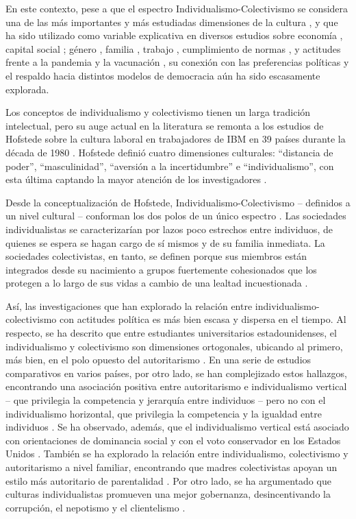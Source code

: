 \documentclass[12pt,twoside]{templates/facsothesis}
\begin{document}
En este contexto, pese a que el espectro Individualismo-Colectivismo se considera una de las más importantes y más estudiadas dimensiones de la cultura \citep{binder2019, fatehi2020}, y que ha sido utilizado como variable explicativa en diversos estudios sobre economía \citep{binder2019, kyriacou2016, germani2021, toikko2020}, capital social \citep{beilmann2018}; género \citep{dabiriyantehrani2022, davis2019}, familia \citep{al-hassan2021, rudy2006}, trabajo \citep{refslund2022, solis2018, stewart2020}, cumplimiento de normas \citep{varet2018, zhang2020}, y actitudes frente a la pandemia y la vacunación \citep{card2022}, su conexión con las preferencias políticas y el respaldo hacia distintos modelos de democracia aún ha sido escasamente explorada.

Los conceptos de individualismo y colectivismo tienen un larga tradición intelectual, pero su auge actual en la literatura se remonta a los estudios de Hofstede sobre la cultura laboral en trabajadores de IBM en 39 países durante la década de 1980 \citep{oyserman2002}. Hofstede definió cuatro dimensiones culturales: ``distancia de poder'', ``masculinidad'', ``aversión a la incertidumbre'' e ``individualismo'', con esta última captando la mayor atención de los investigadores \citep{brewer2007}.

Desde la conceptualización de Hofstede, Individualismo-Colectivismo -- definidos a un nivel cultural -- conforman los dos polos de un único espectro \citep{oyserman2002}. Las sociedades individualistas se caracterizarían por lazos poco estrechos entre individuos, de quienes se espera se hagan cargo de sí mismos y de su familia inmediata. La sociedades colectivistas, en tanto, se definen porque sus miembros están integrados desde su nacimiento a grupos fuertemente cohesionados que los protegen a lo largo de sus vidas a cambio de una lealtad incuestionada \citep{yoon2010}.

Así, las investigaciones que han explorado la relación entre individualismo-colectivismo con actitudes política es más bien escasa y dispersa en el tiempo. Al respecto, se ha descrito que entre estudiantes universitarios estadounidenses, el individualismo y colectivismo son dimensiones ortogonales, ubicando al primero, más bien, en el polo opuesto del autoritarismo \citep{gelfand1996}. En una serie de estudios comparativos en varios países, por otro lado, se han complejizado estos hallazgos, encontrando una asociación positiva entre autoritarismo e individualismo vertical -- que privilegia la competencia y jerarquía entre individuos -- pero no con el individualismo horizontal, que privilegia la competencia y la igualdad entre individuos \citep{kemmelmeier2003}. Se ha observado, además, que el individualismo vertical está asociado con orientaciones de dominancia social \citep{strunk1999} y con el voto conservador en los Estados Unidos \citep{zhang2009}. También se ha explorado la relación entre individualismo, colectivismo y autoritarismo a nivel familiar, encontrando que madres colectivistas apoyan un estilo más autoritario de parentalidad \citep{rudy2006}. Por otro lado, se ha argumentado que culturas individualistas promueven una mejor gobernanza, desincentivando la corrupción, el nepotismo y el clientelismo \citep{kyriacou2016}.
\end{document}
